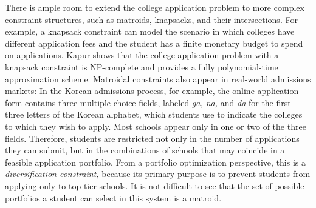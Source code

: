 There is ample room to extend the college application problem to more complex constraint structures, such as matroids, knapsacks, and their intersections. For example, a knapsack constraint can model the scenario in which colleges have different application fees and the student has a finite monetary budget to spend on applications. Kapur \cite{kapur2022} shows that the college application problem with a knapsack constraint is NP-complete and provides a fully polynomial-time approximation scheme. Matroidal constraints also appear in real-world admissions markets: In the Korean admissions process, for example, the online application form contains three multiple-choice fields, labeled \emph{ga, na,} and \emph{da} for the first three letters of the Korean alphabet, which students use to indicate the colleges to which they wish to apply. Most schools appear only in one or two of the three fields. Therefore, students are restricted not only in the number of applications they can submit, but in the combinations of schools that may coincide in a feasible application portfolio. From a portfolio optimization perspective, this is a \emph{diversification constraint,} because its primary purpose is to prevent students from applying only to top-tier schools. It is not difficult to see that the set of possible portfolios a student can select in this system is a matroid.




